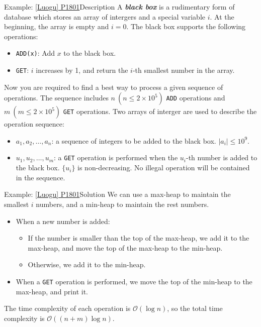\documentclass[aspectratio=169]{ctexbeamer}
\newcommand{\highlight}[1]{\textbf{\textit{#1}}}
\renewcommand{\leq}{\leqslant}
\begin{document}
    \begin{frame}{Example: \href{https://www.luogu.com.cn/problem/P1801}{[Luogu] P1801}}{Description}
        A \highlight{black box} is a rudimentary form of database which stores an array of intergers and a special variable $i$. At the beginning, the array is empty and $i=0$. The black box supports the following operations:

        \begin{itemize}
            \item \texttt{ADD(x)}: Add $x$ to the black box.
            \item \texttt{GET}: $i$ increases by 1, and return the $i$-th smallest number in the array.
        \end{itemize}

        Now you are required to find a best way to process a given sequence of operations. The sequence includes $n\ (n\leq 2\times 10^5)$ \texttt{ADD} operations and $m\ (m\leq 2\times 10^5)$ \texttt{GET} operations. Two arrays of interger are used to describe the operation sequence:

        \begin{itemize}
            \item $a_1,a_2,\dots,a_n$: a sequence of integers to be added to the black box. $|a_i|\leq 10^9$.
            \item $u_1,u_2,\dots,u_m$: a \texttt{GET} operation is performed when the $u_i$-th number is added to the black box. $\{u_i\}$ is non-decreasing. No illegal operation will be contained in the sequence.
        \end{itemize}
    \end{frame}

    \begin{frame}{Example: \href{https://www.luogu.com.cn/problem/P1801}{[Luogu] P1801}}{Solution}
        We can use a max-heap to maintain the smallest $i$ numbers, and a min-heap to maintain the rest numbers.
    
        \begin{itemize}
            \item When a new number is added:
            \begin{itemize}
                \item If the number is smaller than the top of the max-heap, we add it to the max-heap, and move the top of the max-heap to the min-heap.
                \item Otherwise, we add it to the min-heap.
            \end{itemize}
            \item When a \texttt{GET} operation is performed, we move the top of the min-heap to the max-heap, and print it.
        \end{itemize}

        The time complexity of each operation is $\mathcal O(\log n)$, so the total time complexity is $\mathcal O((n+m)\log n)$.
    \end{frame}
\end{document}
